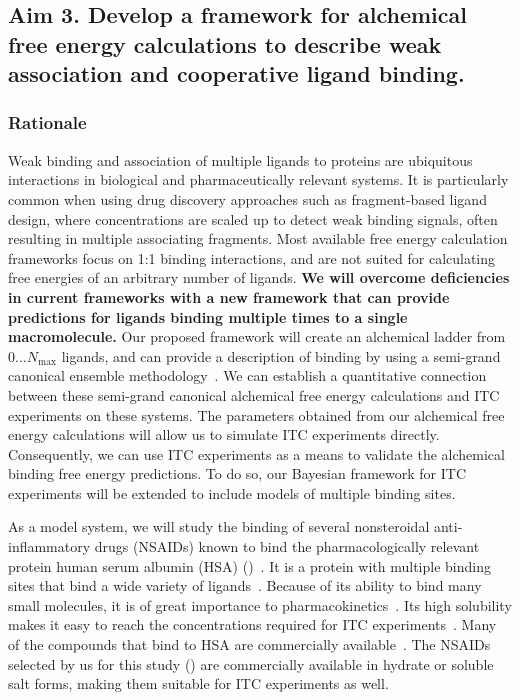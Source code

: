 \documentclass[10pt,final]{article}
\begin{document}
\subsection*{Aim 3. Develop a framework for alchemical free energy calculations to describe weak association and cooperative ligand binding.}
\subsubsection*{Rationale}
Weak binding and association of multiple ligands to proteins are ubiquitous interactions in biological and pharmaceutically relevant systems.
%
It is particularly common when using drug discovery approaches such as fragment-based ligand design, where concentrations are scaled up to detect weak binding signals, often resulting in multiple associating fragments.
%
Most available free energy calculation frameworks focus on 1:1 binding interactions, and are not suited for calculating free energies of an arbitrary number of ligands.
%
\textbf{We will overcome deficiencies in current frameworks with a new framework that can provide predictions for ligands binding multiple times to a single macromolecule.}
%
Our proposed framework will create an alchemical ladder from $0 \ldots N_\mathrm{max}$ ligands, and can provide a description of binding by using a semi-grand canonical ensemble methodology~\autocite{Kofke1988a,Kofke1999a,Lynch2000a}.
%
We can establish a quantitative connection between these semi-grand canonical alchemical free energy calculations and ITC experiments on these systems.
%
The parameters obtained from our alchemical free energy calculations will allow us to simulate ITC experiments directly.
%
Consequently, we can use ITC experiments as a means to validate the alchemical binding free energy predictions.
%
To do so, our Bayesian framework for ITC experiments will be extended to include models of multiple binding sites.
%

As a model system, we will study the binding of several nonsteroidal anti-inflammatory drugs (NSAIDs) known to bind the pharmacologically relevant protein human serum albumin (HSA) ()~\autocite{Zsila2011a}.
%
It is a protein with multiple binding sites that bind a wide variety of ligands~\autocite{He1992a,Kragh-Hansen2002a,Sulkowska2002a}.
%
Because of its ability to bind many small molecules, it is of great importance to pharmacokinetics~\autocite{Metcalfe2010a}.
%
Its high solubility makes it easy to reach the concentrations required for ITC experiments~\autocite{Jr.1995a}. 
%
Many of the compounds that bind to HSA are commercially available~\autocite{Zsila2011a}.
%
The NSAIDs selected by us for this study () are commercially available in hydrate or soluble salt forms, making them suitable for ITC experiments as well.
\end{document}
